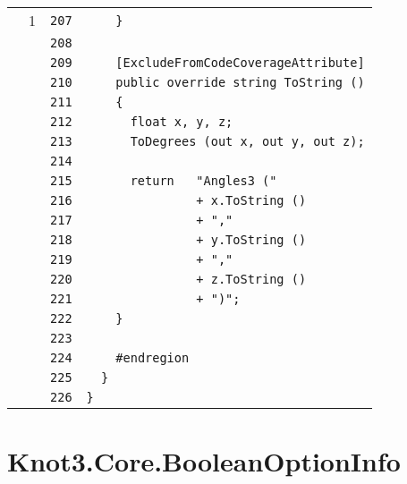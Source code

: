 \documentclass[a4paper,10pt]{article}
\begin{document}
\begin{longtable}[l]{lrrl}
\cellcolor{green} & 1 & \verb~207~ & \verb~    }~\\
\cellcolor{gray} &  & \verb~208~ & \verb~~\\
\cellcolor{gray} &  & \verb~209~ & \verb~    [ExcludeFromCodeCoverageAttribute]~\\
\cellcolor{gray} &  & \verb~210~ & \verb~    public override string ToString ()~\\
\cellcolor{gray} &  & \verb~211~ & \verb~    {~\\
\cellcolor{gray} &  & \verb~212~ & \verb~      float x, y, z;~\\
\cellcolor{gray} &  & \verb~213~ & \verb~      ToDegrees (out x, out y, out z);~\\
\cellcolor{gray} &  & \verb~214~ & \verb~~\\
\cellcolor{gray} &  & \verb~215~ & \verb~      return   "Angles3 ("~\\
\cellcolor{gray} &  & \verb~216~ & \verb~               + x.ToString ()~\\
\cellcolor{gray} &  & \verb~217~ & \verb~               + ","~\\
\cellcolor{gray} &  & \verb~218~ & \verb~               + y.ToString ()~\\
\cellcolor{gray} &  & \verb~219~ & \verb~               + ","~\\
\cellcolor{gray} &  & \verb~220~ & \verb~               + z.ToString ()~\\
\cellcolor{gray} &  & \verb~221~ & \verb~               + ")";~\\
\cellcolor{gray} &  & \verb~222~ & \verb~    }~\\
\cellcolor{gray} &  & \verb~223~ & \verb~~\\
\cellcolor{gray} &  & \verb~224~ & \verb~    #endregion~\\
\cellcolor{gray} &  & \verb~225~ & \verb~  }~\\
\cellcolor{gray} &  & \verb~226~ & \verb~}~\\
\end{longtable}
\newpage
\section{Knot3.Core.BooleanOptionInfo}
\end{document}

